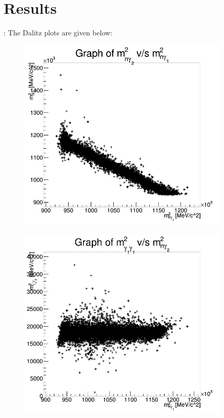 \documentclass[11pt, a4paper]{article}
\begin{document}
\section{Results}:
The Dalitz plots are given below:
\begin{figure}[H]
 \centering
 \includegraphics[width = 0.9\textwidth]{ng2_ng1.png}
\end{figure}

\begin{figure}[H]
 \centering
 \includegraphics[width = 0.9\textwidth]{g1g2_ng2.png}
\end{figure}
\end{document}
